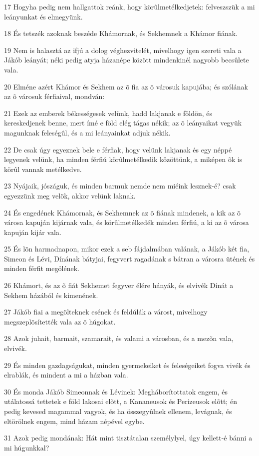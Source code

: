 \par 17 Hogyha pedig nem hallgattok reánk, hogy körûlmetélkedjetek: felveszszük a mi leányunkat és elmegyünk.
\par 18 És tetszék azoknak beszéde Khámornak, és Sekhemnek a Khámor fiának.
\par 19 Nem is halasztá az ifjú a dolog véghezvitelét, mivelhogy igen szereti vala a Jákób leányát; néki pedig atyja házanépe között mindenkinél nagyobb becsûlete vala.
\par 20 Elméne azért Khámor és Sekhem az õ fia az õ városuk kapujába; és szólának az õ városuk férfiaival, mondván:
\par 21 Ezek az emberek békességesek velünk, hadd lakjanak e földön, és kereskedjenek benne, mert ímé e föld elég tágas nékik; az õ leányaikat vegyük magunknak feleségûl, és a mi leányainkat adjuk nékik.
\par 22 De csak úgy egyeznek bele e férfiak, hogy velünk lakjanak és egy néppé legyenek velünk, ha minden férfiú körûlmetélkedik közöttünk, a miképen õk is körûl vannak metélkedve.
\par 23 Nyájaik, jószáguk, és minden barmuk nemde nem miéink lesznek-é? csak egyezzünk meg velök, akkor velünk laknak.
\par 24 És engedének Khámornak, és Sekhemnek az õ fiának mindenek, a kik az õ városa kapuján kijárnak vala, és körûlmetélkedék minden férfiú, a ki az õ városa kapuján kijár vala.
\par 25 És lõn harmadnapon, mikor ezek a seb fájdalmában valának, a Jákób két fia, Simeon és Lévi, Dínának bátyjai, fegyvert ragadának s bátran a városra ütének és minden férfit megölének.
\par 26 Khámort, és az õ fiát Sekhemet fegyver élére hányák, és elvivék Dínát a Sekhem házából és kimenének.
\par 27 Jákób fiai a megölteknek esének és feldúlák a várost, mivelhogy megszeplõsítették vala az õ húgokat.
\par 28 Azok juhait, barmait, szamarait, és valami a városban, és a mezõn vala, elvivék.
\par 29 És minden gazdagságukat, minden gyermekeiket és feleségeiket fogva vivék és elrablák, és mindent a mi a házban vala.
\par 30 És monda Jákób Simeonnak és Lévinek: Megháborítottatok engem, és utálatossá tettetek e föld lakosai elõtt, a Kananeusok és Perizeusok elõtt; én pedig kevesed magammal vagyok, és ha összegyûlnek ellenem, levágnak, és eltörölnek engem, mind házam népével egybe.
\par 31 Azok pedig mondának: Hát mint tisztátalan személylyel, úgy kellett-é bánni a mi húgunkkal?


